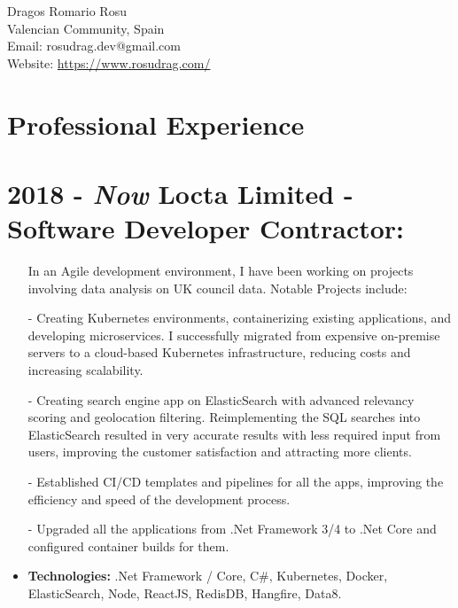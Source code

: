 \documentclass[12pt,a4paper]{res}
\begin{document}
\thispagestyle{empty}
  \begin{center}
  \Large{Dragos Romario Rosu  \\ [12pt]}
  \normalsize Valencian Community, Spain\\
  Email: rosudrag.dev@gmail.com\\
  Website: \url{https://www.rosudrag.com/}
  \end{center}
  
\begin{resume}
\vspace{-10mm}
\section{\large\bf Professional Experience}

\section{\bf 2018 - \textit{Now} \hspace{0.6mm} Locta Limited - Software Developer Contractor:}
\vspace{5mm}    
	\begin{itemize}
	\item[] In an Agile development environment, I have been working on projects involving data analysis on UK council data. Notable Projects include:
  \item[-] Creating Kubernetes environments, containerizing existing applications, and developing microservices. I successfully migrated from expensive on-premise servers to a cloud-based Kubernetes infrastructure, reducing costs and increasing scalability.
  \item[-] Creating search engine app on ElasticSearch with advanced relevancy scoring and geolocation filtering. Reimplementing the SQL searches into ElasticSearch resulted in very accurate results with less required input from users, improving the customer satisfaction and attracting more clients.
\item[-] Established CI/CD templates and pipelines for all the apps, improving the efficiency and speed of the development process.
\item[-] Upgraded all the applications from .Net Framework 3/4 to .Net Core and configured container builds for them.
	\item \textbf{Technologies:} .Net Framework / Core, C\#, Kubernetes, Docker, ElasticSearch, Node, ReactJS, RedisDB, Hangfire, Data8.
	\end{itemize}

\end{resume}
\end{document}
